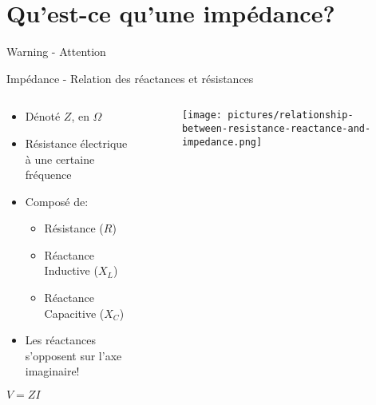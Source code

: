 \section{Qu'est-ce qu'une impédance?}

\begin{frame}{Warning - Attention}
\end{frame}

\begin{frame}{Impédance - Relation des réactances et résistances}
    \begin{columns}
        \begin{column}{0.5\textwidth}
            \begin{itemize}
                \item Dénoté $Z$, en $\Omega$
                \item Résistance électrique à une certaine fréquence
                \item Composé de:
                \begin{itemize}
                    \item Résistance ($R$)
                    \item Réactance Inductive ($X_L$)
                    \item Réactance Capacitive ($X_C$)
                \end{itemize}
                \item Les réactances s'opposent sur l'axe imaginaire!
            \end{itemize}
            \par
            \begin{center}
                \Large{$V = ZI$}
            \end{center}
        \end{column}
        
        \begin{column}{0.5\textwidth}
            \begin{figure}
                \centering
                \texttt{[image: pictures/relationship-between-resistance-reactance-and-impedance.png]}
            \end{figure}
        \end{column}
    \end{columns}
\end{frame}

